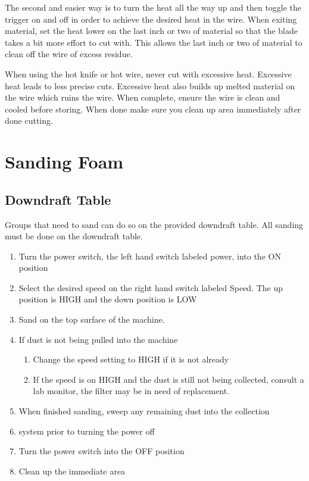 The second and easier way is to turn the heat all the way up and then toggle the trigger on and off in order to achieve the desired heat in the wire.  When exiting material, set the heat lower on the last inch or two of material so that the blade takes a bit more effort to cut with. This allows the last inch or two of material to clean off the wire of excess residue.

When using the hot knife or hot wire, never cut with excessive heat.  Excessive heat leads to less precise cuts.  Excessive heat also builds up melted material on the wire which ruins the wire.  When complete, ensure the wire is clean and cooled before storing.  When done make sure you clean up area immediately after done cutting.

\section{Sanding Foam}
\subsection{Downdraft Table}
Groups that need to sand can do so on the provided downdraft table. All sanding must be done on the downdraft table.
\begin{enumerate}
\item Turn the power switch, the left hand switch labeled power, into the ON position
\item Select the desired speed on the right hand switch labeled Speed. The up position is HIGH and the down position is LOW
\item Sand on the top surface of the machine.
\item If dust is not being pulled into the machine
\begin{enumerate}
\item Change the speed setting to HIGH if it is not already
\item If the speed is on HIGH and the dust is still not being collected, consult a lab monitor, the filter may be in need of replacement.
\end{enumerate}
\item When finished sanding, sweep any remaining dust into the collection \item system prior to turning the power off
\item Turn the power switch into the OFF position
\item Clean up the immediate area
\end{enumerate}

